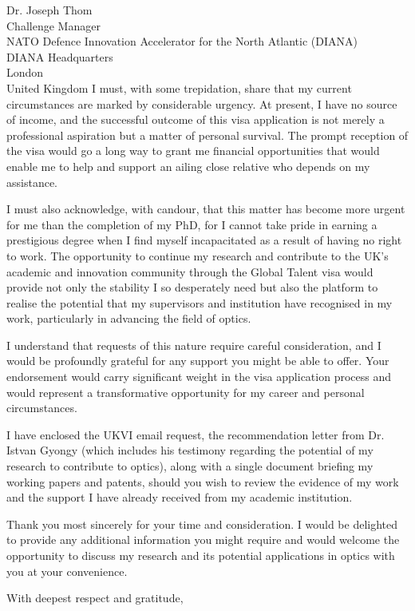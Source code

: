\documentclass[12pt,a4paper]{letter}
\begin{document}
\begin{letter}{Dr. Joseph Thom\\Challenge Manager\\NATO Defence Innovation Accelerator for the North Atlantic (DIANA)\\DIANA Headquarters\\London\\United Kingdom}
I must, with some trepidation, share that my current circumstances are marked by considerable urgency. At present, I have no source of income, and the successful outcome of this visa application is not merely a professional aspiration but a matter of personal survival. The prompt reception of the visa would go a long way to grant me financial opportunities that would enable me to help and support an ailing close relative who depends on my assistance. 

I must also acknowledge, with candour, that this matter has become more urgent for me than the completion of my PhD, for I cannot take pride in earning a prestigious degree when I find myself incapacitated as a result of having no right to work. The opportunity to continue my research and contribute to the UK's academic and innovation community through the Global Talent visa would provide not only the stability I so desperately need but also the platform to realise the potential that my supervisors and institution have recognised in my work, particularly in advancing the field of optics.

I understand that requests of this nature require careful consideration, and I would be profoundly grateful for any support you might be able to offer. Your endorsement would carry significant weight in the visa application process and would represent a transformative opportunity for my career and personal circumstances.

I have enclosed the UKVI email request, the recommendation letter from Dr. Istvan Gyongy (which includes his testimony regarding the potential of my research to contribute to optics), along with a single document briefing my working papers and patents, should you wish to review the evidence of my work and the support I have already received from my academic institution.

Thank you most sincerely for your time and consideration. I would be delighted to provide any additional information you might require and would welcome the opportunity to discuss my research and its potential applications in optics with you at your convenience.

\closing{With deepest respect and gratitude,}

\signature{Deborah Akuoko}


\end{letter}
\end{document}

